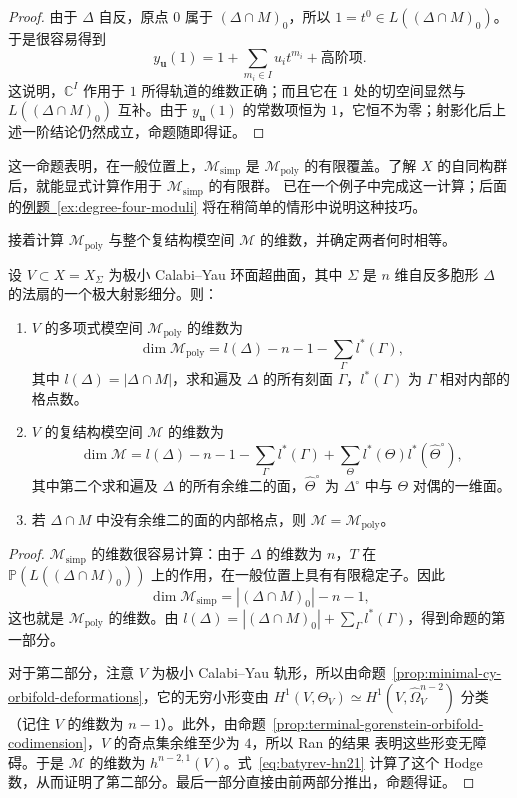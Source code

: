 \begin{proof}
由于 $\Delta$ 自反，原点 $0$ 属于 $(\Delta\cap M)_0$，所以 $1=t^0\in L((\Delta\cap M)_0)$。于是很容易得到
\[
y_{\mathbf u}(1)=1+\sum_{m_i\in I}u_i t^{m_i}+\text{高阶项}.
\]
这说明，$\mathbb C^I$ 作用于 $1$ 所得轨道的维数正确；而且它在 $1$ 处的切空间显然与 $L((\Delta\cap M)_0)$ 互补。由于 $y_{\mathbf u}(1)$ 的常数项恒为 $1$，它恒不为零；射影化后上述一阶结论仍然成立，命题随即得证。
\end{proof}

这一命题表明，在一般位置上，$\mathcal M_{\mathrm{simp}}$ 是 $\mathcal M_{\mathrm{poly}}$ 的有限覆盖。了解 $X$ 的自同构群后，就能显式计算作用于 $\mathcal M_{\mathrm{simp}}$ 的有限群。 已在一个例子中完成这一计算；后面的\hyperref[ex:degree-four-moduli]{例题~\ref*{ex:degree-four-moduli}} 将在稍简单的情形中说明这种技巧。

接着计算 $\mathcal M_{\mathrm{poly}}$ 与整个复结构模空间 $\mathcal M$ 的维数，并确定两者何时相等。
\begin{proposition}\label{prop:toric-moduli-dimensions}
设 $V\subset X=X_\Sigma$ 为极小 Calabi--Yau 环面超曲面，其中 $\Sigma$ 是 $n$ 维自反多胞形 $\Delta$ 的法扇的一个极大射影细分。则：
\begin{enumerate}[label=(\roman*)]
\item $V$ 的多项式模空间 $\mathcal M_{\mathrm{poly}}$ 的维数为
\[
\dim\mathcal M_{\mathrm{poly}}=l(\Delta)-n-1-\sum_\Gamma l^*(\Gamma),
\]
其中 $l(\Delta)=|\Delta\cap M|$，求和遍及 $\Delta$ 的所有刻面 $\Gamma$，$l^*(\Gamma)$ 为 $\Gamma$ 相对内部的格点数。
\item $V$ 的复结构模空间 $\mathcal M$ 的维数为
\[
\dim\mathcal M=l(\Delta)-n-1-\sum_\Gamma l^*(\Gamma)
+\sum_\Theta l^*(\Theta)l^*(\widehat\Theta^\circ),
\]
其中第二个求和遍及 $\Delta$ 的所有余维二的面，$\widehat\Theta^\circ$ 为 $\Delta^\circ$ 中与 $\Theta$ 对偶的一维面。
\item 若 $\Delta\cap M$ 中没有余维二的面的内部格点，则 $\mathcal M=\mathcal M_{\mathrm{poly}}$。
\end{enumerate}
\end{proposition}
\begin{proof}
$\mathcal M_{\mathrm{simp}}$ 的维数很容易计算：由于 $\Delta$ 的维数为 $n$，$T$ 在 $\mathbb P(L((\Delta\cap M)_0))$ 上的作用，在一般位置上具有有限稳定子。因此
\[
\dim\mathcal M_{\mathrm{simp}}=|(\Delta\cap M)_0|-n-1,
\]
这也就是 $\mathcal M_{\mathrm{poly}}$ 的维数。由 $l(\Delta)=|(\Delta\cap M)_0|+\sum_\Gamma l^*(\Gamma)$，得到命题的第一部分。

对于第二部分，注意 $V$ 为极小 Calabi--Yau 轨形，所以由命题~\ref{prop:minimal-cy-orbifold-deformations}，它的无穷小形变由 $H^1(V,\Theta_V)\simeq H^1(V,\widehat\Omega_V^{n-2})$ 分类（记住 $V$ 的维数为 $n-1$）。此外，由命题~\ref{prop:terminal-gorenstein-orbifold-codimension}，$V$ 的奇点集余维至少为 $4$，所以 Ran 的结果  表明这些形变无障碍。于是 $\mathcal M$ 的维数为 $h^{n-2,1}(V)$。式~\eqref{eq:batyrev-hn21} 计算了这个 Hodge 数，从而证明了第二部分。最后一部分直接由前两部分推出，命题得证。
\end{proof}

